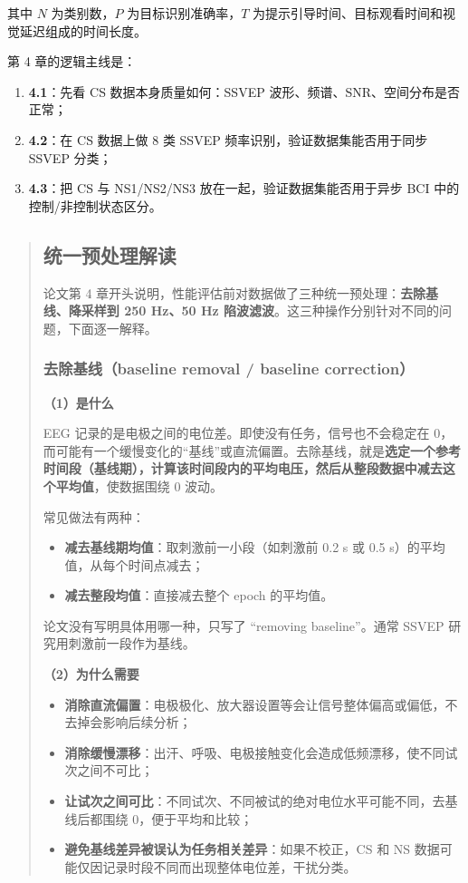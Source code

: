 \documentclass[12pt, a4paper]{ctexart}
\begin{document}
其中 $N$ 为类别数，$P$ 为目标识别准确率，$T$ 为提示引导时间、目标观看时间和视觉延迟组成的时间长度。

第 4 章的逻辑主线是：

\begin{enumerate}
  \item \textbf{4.1}：先看 CS 数据本身质量如何：SSVEP 波形、频谱、SNR、空间分布是否正常；
  \item \textbf{4.2}：在 CS 数据上做 8 类 SSVEP 频率识别，验证数据集能否用于同步 SSVEP 分类；
  \item \textbf{4.3}：把 CS 与 NS1/NS2/NS3 放在一起，验证数据集能否用于异步 BCI 中的控制/非控制状态区分。
\end{enumerate}

\begin{quote}
\subsection*{统一预处理解读}

论文第 4 章开头说明，性能评估前对数据做了三种统一预处理：\textbf{去除基线、降采样到 250 Hz、50 Hz 陷波滤波}。这三种操作分别针对不同的问题，下面逐一解释。

\subsubsection*{去除基线（baseline removal / baseline correction）}

\textbf{（1）是什么}

EEG 记录的是电极之间的电位差。即使没有任务，信号也不会稳定在 0，而可能有一个缓慢变化的``基线''或直流偏置。去除基线，就是\textbf{选定一个参考时间段（基线期），计算该时间段内的平均电压，然后从整段数据中减去这个平均值}，使数据围绕 0 波动。

常见做法有两种：
\begin{itemize}
  \item \textbf{减去基线期均值}：取刺激前一小段（如刺激前 0.2 s 或 0.5 s）的平均值，从每个时间点减去；
  \item \textbf{减去整段均值}：直接减去整个 epoch 的平均值。
\end{itemize}

论文没有写明具体用哪一种，只写了 ``removing baseline''。通常 SSVEP 研究用刺激前一段作为基线。

\textbf{（2）为什么需要}
\begin{itemize}
  \item \textbf{消除直流偏置}：电极极化、放大器设置等会让信号整体偏高或偏低，不去掉会影响后续分析；
  \item \textbf{消除缓慢漂移}：出汗、呼吸、电极接触变化会造成低频漂移，使不同试次之间不可比；
  \item \textbf{让试次之间可比}：不同试次、不同被试的绝对电位水平可能不同，去基线后都围绕 0，便于平均和比较；
  \item \textbf{避免基线差异被误认为任务相关差异}：如果不校正，CS 和 NS 数据可能仅因记录时段不同而出现整体电位差，干扰分类。
\end{itemize}


\end{quote}
\end{document}
